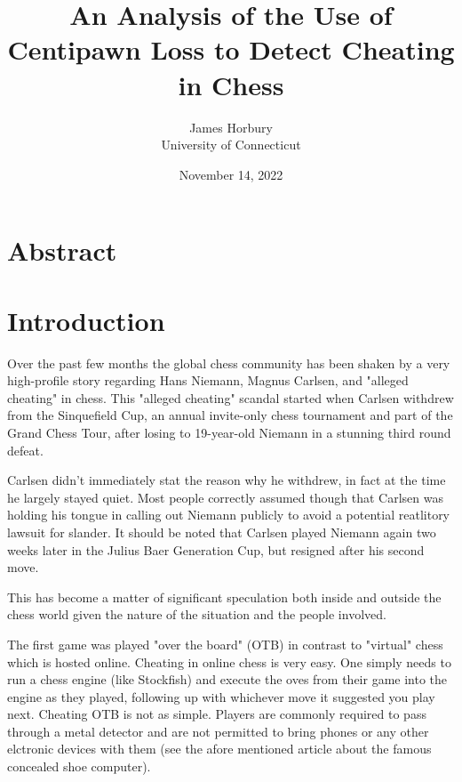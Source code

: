 \documentclass[12pt]{article}
\title{An Analysis of the Use of Centipawn Loss to Detect Cheating in Chess}
\author{James Horbury\\
    University of Connecticut
}
\date{November 14, 2022}
\begin{document}
\maketitle

\section*{Abstract}
\label{sec:abs}


\section*{Introduction}
\label{sec:intro}

Over the past few months the global chess community has been shaken by a very high-profile story regarding Hans Niemann, Magnus Carlsen, and "alleged cheating" in chess. This "alleged cheating" scandal started when Carlsen withdrew from the Sinquefield Cup, an annual invite-only chess tournament and part of the Grand Chess Tour, after losing to 19-year-old Niemann in a stunning third round defeat.


Carlsen didn't immediately stat the reason why he withdrew, in fact at the time he largely stayed quiet. Most people correctly assumed though that Carlsen was holding his tongue in calling out Niemann publicly to avoid a potential reatlitory lawsuit for slander. It should be noted that Carlsen played Niemann again two weeks later in the Julius Baer Generation Cup, but resigned after his second move.

This has become a matter of significant speculation both inside and outside the chess world given the nature of the situation and the people involved.

The first game was played "over the board" (OTB) in contrast to "virtual" chess which is hosted online. Cheating in online chess is very easy. One simply needs to run a chess engine (like Stockfish) and execute the oves from their game into the engine as they played, following up with whichever move it suggested you play next. Cheating OTB is not as simple. Players are commonly required to pass through a metal detector and are not permitted to bring phones or any other elctronic devices with them (see the afore mentioned article about the famous concealed shoe computer).
\end{document}
